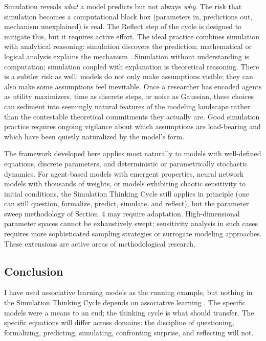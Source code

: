\documentclass[fleqn,10pt]{wlscirep}
\begin{document}
\begin{linenumbers}
Simulation reveals \emph{what} a model predicts but not always \emph{why}. The risk that simulation becomes a computational black box (parameters in, predictions out, mechanism unexplained) is real. The Reflect step of the cycle is designed to mitigate this, but it requires active effort. The ideal practice combines simulation with analytical reasoning: simulation discovers the prediction; mathematical or logical analysis explains the mechanism \citep{navarro2021mathematical}. Simulation without understanding is computation; simulation coupled with explanation is theoretical reasoning. There is a subtler risk as well: models do not only make assumptions visible; they can also make some assumptions feel inevitable. Once a researcher has encoded agents as utility maximizers, time as discrete steps, or noise as Gaussian, these choices can sediment into seemingly natural features of the modeling landscape rather than the contestable theoretical commitments they actually are. Good simulation practice requires ongoing vigilance about which assumptions are load-bearing and which have been quietly naturalized by the model's form.

The framework developed here applies most naturally to models with well-defined equations, discrete parameters, and deterministic or parametrically stochastic dynamics. For agent-based models with emergent properties, neural network models with thousands of weights, or models exhibiting chaotic sensitivity to initial conditions, the Simulation Thinking Cycle still applies in principle (one can still question, formalize, predict, simulate, and reflect), but the parameter sweep methodology of Section~4 may require adaptation. High-dimensional parameter spaces cannot be exhaustively swept; sensitivity analysis in such cases requires more sophisticated sampling strategies or surrogate modeling approaches. These extensions are active areas of methodological research.

\subsection{Conclusion}

I have used associative learning models as the running example, but nothing in the Simulation Thinking Cycle depends on associative learning \citep{smaldino2023modeling, shiffrin2010perspectives}. The specific models were a means to an end; the thinking cycle is what should transfer. The specific equations will differ across domains; the discipline of questioning, formalizing, predicting, simulating, confronting surprise, and reflecting will not.


\end{linenumbers}
\end{document}
